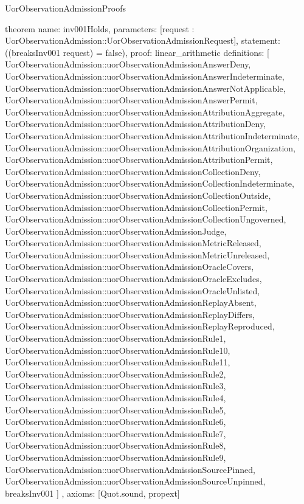 \begin{lexlean}{UorObservationAdmissionProofs}
\begin{semanticmodule}
theorem{
  name: inv001Holds,
  parameters: [request : UorObservationAdmission::UorObservationAdmissionRequest],
  statement: ((breaksInv001 request) = false),
  proof: linear_arithmetic{
    definitions: [
      UorObservationAdmission::uorObservationAdmissionAnswerDeny,
      UorObservationAdmission::uorObservationAdmissionAnswerIndeterminate,
      UorObservationAdmission::uorObservationAdmissionAnswerNotApplicable,
      UorObservationAdmission::uorObservationAdmissionAnswerPermit,
      UorObservationAdmission::uorObservationAdmissionAttributionAggregate,
      UorObservationAdmission::uorObservationAdmissionAttributionDeny,
      UorObservationAdmission::uorObservationAdmissionAttributionIndeterminate,
      UorObservationAdmission::uorObservationAdmissionAttributionOrganization,
      UorObservationAdmission::uorObservationAdmissionAttributionPermit,
      UorObservationAdmission::uorObservationAdmissionCollectionDeny,
      UorObservationAdmission::uorObservationAdmissionCollectionIndeterminate,
      UorObservationAdmission::uorObservationAdmissionCollectionOutside,
      UorObservationAdmission::uorObservationAdmissionCollectionPermit,
      UorObservationAdmission::uorObservationAdmissionCollectionUngoverned,
      UorObservationAdmission::uorObservationAdmissionJudge,
      UorObservationAdmission::uorObservationAdmissionMetricReleased,
      UorObservationAdmission::uorObservationAdmissionMetricUnreleased,
      UorObservationAdmission::uorObservationAdmissionOracleCovers,
      UorObservationAdmission::uorObservationAdmissionOracleExcludes,
      UorObservationAdmission::uorObservationAdmissionOracleUnlisted,
      UorObservationAdmission::uorObservationAdmissionReplayAbsent,
      UorObservationAdmission::uorObservationAdmissionReplayDiffers,
      UorObservationAdmission::uorObservationAdmissionReplayReproduced,
      UorObservationAdmission::uorObservationAdmissionRule1,
      UorObservationAdmission::uorObservationAdmissionRule10,
      UorObservationAdmission::uorObservationAdmissionRule11,
      UorObservationAdmission::uorObservationAdmissionRule2,
      UorObservationAdmission::uorObservationAdmissionRule3,
      UorObservationAdmission::uorObservationAdmissionRule4,
      UorObservationAdmission::uorObservationAdmissionRule5,
      UorObservationAdmission::uorObservationAdmissionRule6,
      UorObservationAdmission::uorObservationAdmissionRule7,
      UorObservationAdmission::uorObservationAdmissionRule8,
      UorObservationAdmission::uorObservationAdmissionRule9,
      UorObservationAdmission::uorObservationAdmissionSourcePinned,
      UorObservationAdmission::uorObservationAdmissionSourceUnpinned,
      breaksInv001
    ]
  },
  axioms: [Quot.sound, propext]
}


\end{semanticmodule}
\end{lexlean}

